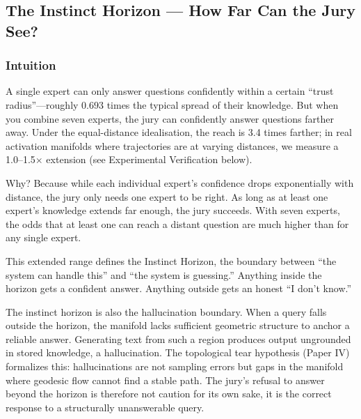 \documentclass[11pt]{article}
\begin{document}
\subsection{The Instinct Horizon — How Far Can the Jury See?}

\subsubsection*{Intuition}

A single expert can only answer questions confidently within a certain
``trust radius''---roughly $0.693$ times the typical spread of their knowledge.
But when you combine seven experts, the jury can
confidently answer questions farther away. Under the equal-distance idealisation,
the reach is 3.4 times farther; in real activation manifolds where trajectories
are at varying distances, we measure a 1.0--1.5$\times$ extension (see Experimental Verification below).

Why? Because while each individual expert's confidence drops exponentially with
distance, the jury only needs one expert to be right. As long as at
least one expert's knowledge extends far enough, the jury succeeds. With seven
experts, the odds that at least one can reach a distant question are much higher
than for any single expert.

This extended range defines the Instinct Horizon, the boundary between
``the system can handle this'' and ``the system is guessing.'' Anything inside
the horizon gets a confident answer. Anything outside gets an honest ``I don't
know.''

The instinct horizon is also the hallucination boundary. When a query
falls outside the horizon, the manifold lacks sufficient geometric structure to
anchor a reliable answer. Generating text from such a region produces output
ungrounded in stored knowledge, a hallucination. The topological tear
hypothesis (Paper IV) formalizes this: hallucinations are not sampling errors
but gaps in the manifold where geodesic flow cannot find a stable path. The
jury's refusal to answer beyond the horizon is therefore not caution for its
own sake, it is the correct response to a structurally unanswerable query.
\end{document}
